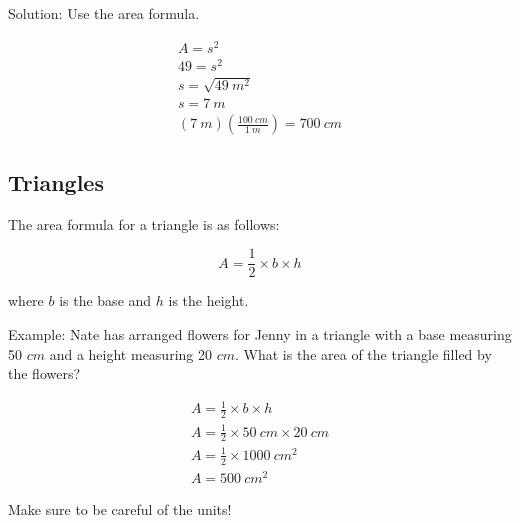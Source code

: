 \documentclass[a4paper, 12pt]{article}
\begin{document}
Solution: Use the area formula.

\begin{gather*}
A = s^2 \\
49 = s^2 \\
s = \sqrt{49 \: m^2} \\
s = 7 \: m \\
(7 \: m)\left(\frac{100 \: cm}{1 \: m}\right) = \boxed{700 \: cm}
\end{gather*}

\subsection*{Triangles}
The area formula for a triangle is as follows:

$$A = \frac{1}{2} \times b \times h$$

where $b$ is the base and $h$ is the height.

Example: Nate has arranged flowers for Jenny in a triangle with a base measuring 50 $cm$ and a height measuring 20 $cm$. What is the area of the triangle filled by the flowers?

\begin{gather*}
A = \frac{1}{2} \times b \times h \\
A = \frac{1}{2} \times 50 \: cm \times 20 \: cm \\
A = \frac{1}{2} \times 1000 \: cm^2 \\ 
A = \boxed{500 \: cm^2}
\end{gather*}

\huge{Make sure to be careful of the units!}
\end{document}
